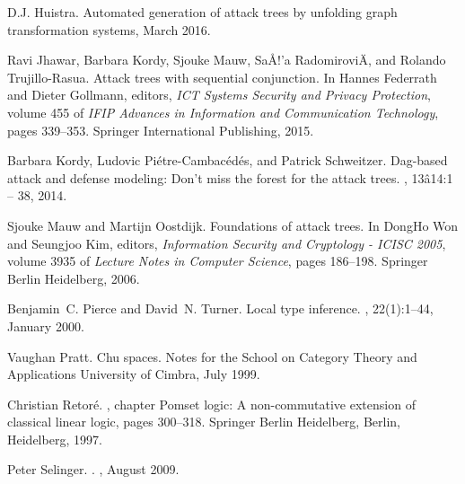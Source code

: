 \documentclass{sigplanconf}
\begin{document}
\begin{thebibliography}{10}
  D.J. {Huistra}.
  \newblock Automated generation of attack trees by unfolding graph
  transformation systems, March 2016.

  Ravi Jhawar, Barbara Kordy, Sjouke Mauw, Sa{\AA}{!'}a Radomirovi{\"A}, and
  Rolando Trujillo-Rasua.
  \newblock Attack trees with sequential conjunction.
  \newblock In Hannes Federrath and Dieter Gollmann, editors, {\em ICT Systems
    Security and Privacy Protection}, volume 455 of {\em IFIP Advances in
    Information and Communication Technology}, pages 339--353. Springer
  International Publishing, 2015.

  Barbara Kordy, Ludovic Pi{\'e}tre-Cambac{\'e}d{\'e}s, and Patrick Schweitzer.
  \newblock Dag-based attack and defense modeling: Don't miss the forest for the
  attack trees.
  , 13{\^a}14:1 -- 38, 2014.

  Sjouke Mauw and Martijn Oostdijk.
  \newblock Foundations of attack trees.
  \newblock In DongHo Won and Seungjoo Kim, editors, {\em Information Security
    and Cryptology - ICISC 2005}, volume 3935 of {\em Lecture Notes in Computer
    Science}, pages 186--198. Springer Berlin Heidelberg, 2006.

  Benjamin~C. Pierce and David~N. Turner.
  \newblock Local type inference.
  , 22(1):1--44, January 2000.

  Vaughan Pratt.
  \newblock Chu spaces.
  \newblock Notes for the School on Category Theory and Applications University
  of Cimbra, July 1999.

  Christian Retor{\'e}.
  , chapter Pomset logic: A non-commutative
  extension of classical linear logic, pages 300--318.
  \newblock Springer Berlin Heidelberg, Berlin, Heidelberg, 1997.

  Peter {Selinger}.
  .
  , August 2009.


\end{thebibliography}
\end{document}
